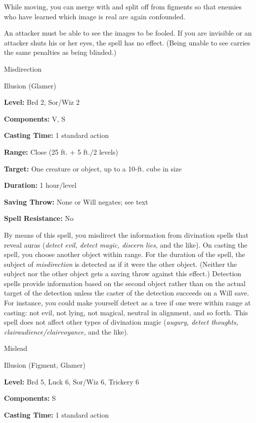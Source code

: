 \documentclass{article}
\begin{document}
While moving, you can merge with and split off from figments so that enemies who 
have learned which image is real are again confounded.

An attacker must be able to see the images to be fooled. If you are invisible or 
an attacker shuts his or her eyes, the spell has no effect. (Being unable to see 
carries the same penalties as being blinded.)

\vspace{12pt}
Misdirection

Illusion (Glamer)

\textbf{Level:} Brd 2, Sor/Wiz 2

\textbf{Components:} V, S

\textbf{Casting Time:} 1 standard action

\textbf{Range:} Close (25 ft. + 5 ft./2 levels)

\textbf{Target:} One creature or object, up to a 10-ft. cube in size

\textbf{Duration:} 1 hour/level

\textbf{Saving Throw:} None or Will negates; see text

\textbf{Spell Resistance:} No

By means of this spell, you misdirect the information from divination spells that 
reveal auras (\textit{detect evil, detect magic, discern lies, }and the like). 
On casting the spell, you choose another object within range. For the duration 
of the spell, the subject of \textit{misdirection }is detected as if it were the 
other object. (Neither the subject nor the other object gets a saving throw against 
this effect.) Detection spells provide information based on the second object rather 
than on the actual target of the detection unless the caster of the detection succeeds 
on a Will save. For instance, you could make yourself detect as a tree if one were 
within range at casting: not evil, not lying, not magical, neutral in alignment, 
and so forth. This spell does not affect other types of divination magic (\textit{augury, 
detect thoughts, clairaudience/clairvoyance, }and the like).

\vspace{12pt}
Mislead

Illusion (Figment, Glamer)

\textbf{Level:} Brd 5, Luck 6, Sor/Wiz 6, Trickery 6

\textbf{Components:} S

\textbf{Casting Time:} 1 standard action
\end{document}
